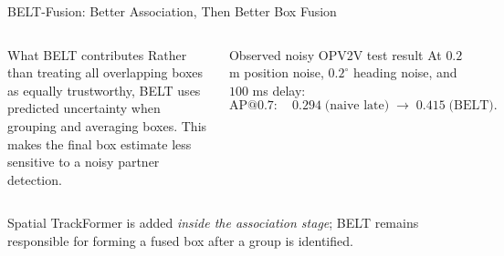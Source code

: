 \documentclass[aspectratio=169,10pt]{beamer}
\begin{document}
\begin{frame}{BELT-Fusion: Better Association, Then Better Box Fusion}
\small
\centering
{}

\vspace{4mm}
\begin{columns}[T,onlytextwidth]
\begin{block}{What BELT contributes}
Rather than treating all overlapping boxes as equally trustworthy, BELT uses
predicted uncertainty when grouping and averaging boxes. This makes the final
box estimate less sensitive to a noisy partner detection.
\end{block}
\begin{block}{Observed noisy OPV2V test result}
At $0.2$ m position noise, $0.2^\circ$ heading noise, and $100$ ms delay:
\[
\mathrm{AP@0.7}:\quad 0.294\;\text{(naive late)}
\;\longrightarrow\;0.415\;\text{(BELT)}.
\]
\end{block}
\end{columns}

\vspace{2mm}\footnotesize
Spatial TrackFormer is added \emph{inside the association stage}; BELT remains
responsible for forming a fused box after a group is identified.
\end{frame}
\end{document}
